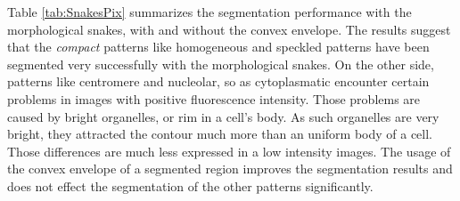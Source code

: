 Table \ref{tab:SnakesPix} summarizes the segmentation performance with the morphological snakes, with and without the convex envelope. The results suggest that the \textit{ compact} patterns like homogeneous and speckled patterns have been segmented very successfully with the morphological snakes. On the other side, patterns like centromere and nucleolar, so as cytoplasmatic encounter certain problems in images with positive fluorescence intensity. Those problems are caused by bright organelles, or rim in a cell's body. As such organelles are very bright, they attracted the contour much more than an uniform body of a cell. Those differences are much less expressed in a low intensity images. The usage of the convex envelope of a segmented region improves the segmentation results and does not effect the segmentation of the other patterns significantly.  